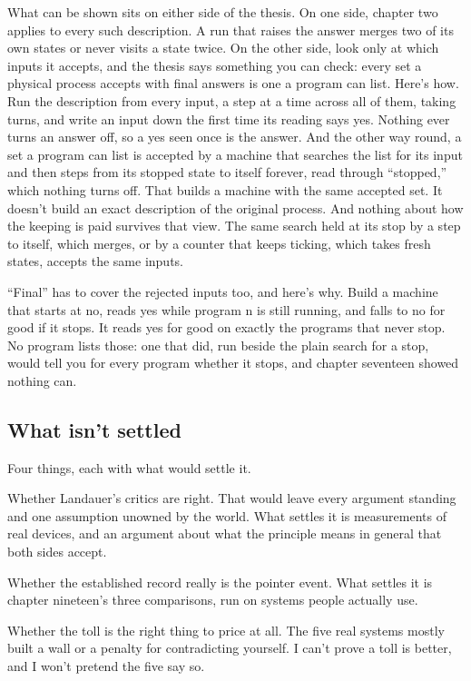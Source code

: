 \documentclass[11pt,twoside]{article}
\theoremstyle{thielethm}
\theoremstyle{thieledef}
\theoremstyle{thieledef}
\theoremstyle{thieledef}
\theoremstyle{thielethm}
\theoremstyle{thieleobs}
\theoremstyle{thielethm}
\begin{document}
What can be shown sits on either side of the thesis. On one side, chapter two applies to every such description. A run that raises the answer merges two of its own states or never visits a state twice. On the other side, look only at which inputs it accepts, and the thesis says something you can check: every set a physical process accepts with final answers is one a program can list. Here's how. Run the description from every input, a step at a time across all of them, taking turns, and write an input down the first time its reading says yes. Nothing ever turns an answer off, so a yes seen once is the answer. And the other way round, a set a program can list is accepted by a machine that searches the list for its input and then steps from its stopped state to itself forever, read through ``stopped,'' which nothing turns off. That builds a machine with the same accepted set. It doesn't build an exact description of the original process. And nothing about how the keeping is paid survives that view. The same search held at its stop by a step to itself, which merges, or by a counter that keeps ticking, which takes fresh states, accepts the same inputs.

``Final'' has to cover the rejected inputs too, and here's why. Build a machine that starts at no, reads yes while program n is still running, and falls to no for good if it stops. It reads yes for good on exactly the programs that never stop. No program lists those: one that did, run beside the plain search for a stop, would tell you for every program whether it stops, and chapter seventeen showed nothing can.

\subsection{What isn't settled}

Four things, each with what would settle it.

Whether Landauer's critics are right. That would leave every argument standing and one assumption unowned by the world. What settles it is measurements of real devices, and an argument about what the principle means in general that both sides accept.

Whether the established record really is the pointer event. What settles it is chapter nineteen's three comparisons, run on systems people actually use.

Whether the toll is the right thing to price at all. The five real systems mostly built a wall or a penalty for contradicting yourself. I can't prove a toll is better, and I won't pretend the five say so.
\end{document}

